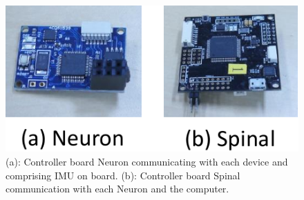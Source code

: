 \begin{figure}[t]
  \begin{center}
    \includegraphics[width=0.8\columnwidth]{figs/controller_board.pdf}
  \end{center}
  \caption{(a): Controller board Neuron communicating with each device and comprising IMU on board. (b): Controller board Spinal communication with each Neuron and the computer.\label{figure:controller_board}}
\end{figure}
